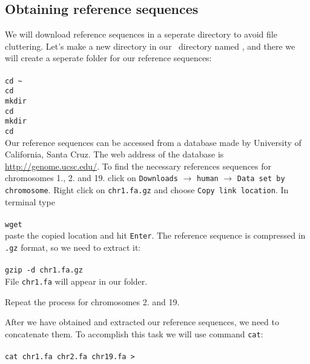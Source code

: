 \subsection{Obtaining reference sequences}
We will download reference sequences in a seperate directory to avoid file cluttering. Let's make
a new directory in our \texttt{\workDir}~directory named \texttt{\reseqDir}, and there we will create
a seperate folder \texttt{} for our reference sequences:\\~\\
\texttt{cd \textasciitilde}\\
\texttt{cd \workDir}\\
\texttt{mkdir \reseqDir}\\
\texttt{cd \reseqDir}\\
\texttt{mkdir }\\
\texttt{cd }\\

Our reference sequences can be accessed from a database made by
University of California, Santa Cruz.
The web address of the database is \url{http://genome.ucsc.edu/}.
To find the necessary references sequences for chromosomes 1., 2. and 19.
click on \texttt{Downloads} $\rightarrow$ \texttt{human} $\rightarrow$
\texttt{Data set by chromosome}. Right click on \texttt{chr1.fa.gz}
and choose \texttt{Copy link location}. In terminal type\\~\\
\texttt{wget} \\

paste the copied location and hit \texttt{Enter}. The reference sequence is compressed in \texttt{.gz}
format, so we need to extract it:\\~\\
\texttt{gzip -d chr1.fa.gz}\\

File \texttt{chr1.fa} will appear in our folder.

Repeat the process for chromosomes 2. and 19.

After we have obtained and extracted our reference sequences, we need to concatenate them.
To accomplish this task we will use command \texttt{cat}:\\~\\
\texttt{cat chr1.fa chr2.fa chr19.fa > }\\


